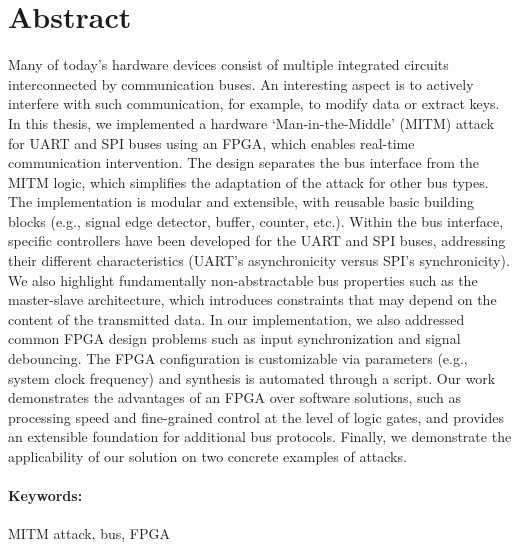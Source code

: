 \documentclass[12pt, twoside]{book}
\begin{document}
\newpage 
\section*{Abstract}

Many of today’s hardware devices consist of multiple integrated circuits interconnected by communication buses. An interesting aspect is to actively interfere with such communication, for example, to modify data or extract keys. In this thesis, we implemented a hardware `Man-in-the-Middle' (MITM) attack for UART and SPI buses using an FPGA, which enables real-time communication intervention. The design separates the bus interface from the MITM logic, which simplifies the adaptation of the attack for other bus types. The implementation is modular and extensible, with reusable basic building blocks (e.g., signal edge detector, buffer, counter, etc.). Within the bus interface, specific controllers have been developed for the UART and SPI buses, addressing their different characteristics (UART’s asynchronicity versus SPI’s synchronicity). We also highlight fundamentally non-abstractable bus properties such as the master-slave architecture, which introduces constraints that may depend on the content of the transmitted data. In our implementation, we also addressed common FPGA design problems such as input synchronization and signal debouncing. The FPGA configuration is customizable via parameters (e.g., system clock frequency) and synthesis is automated through a script. Our work demonstrates the advantages of an FPGA over software solutions, such as processing speed and fine-grained control at the level of logic gates, and provides an extensible foundation for additional bus protocols. Finally, we demonstrate the applicability of our solution on two concrete examples of attacks.

\paragraph*{Keywords:} MITM attack, bus, FPGA


%
%
%
\end{document}
